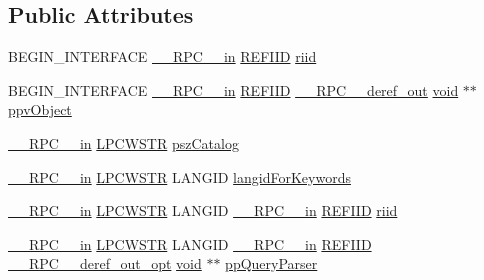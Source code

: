 \subsection*{Public Attributes}
\begin{DoxyCompactItemize}
\item 
B\+E\+G\+I\+N\+\_\+\+I\+N\+T\+E\+R\+F\+A\+CE \hyperlink{rpcsal_8h_a20b7f6da600a05c8b541659f14f7f0e6}{\+\_\+\+\_\+\+R\+P\+C\+\_\+\+\_\+in} \hyperlink{px__win__ds_8c_a80ec49c8ae61e234197d5071d2df497d}{R\+E\+F\+I\+ID} \hyperlink{struct_i_query_parser_manager_vtbl_a6a9583156244a6c5ef4afdb4addb9041}{riid}
\item 
B\+E\+G\+I\+N\+\_\+\+I\+N\+T\+E\+R\+F\+A\+CE \hyperlink{rpcsal_8h_a20b7f6da600a05c8b541659f14f7f0e6}{\+\_\+\+\_\+\+R\+P\+C\+\_\+\+\_\+in} \hyperlink{px__win__ds_8c_a80ec49c8ae61e234197d5071d2df497d}{R\+E\+F\+I\+ID} \hyperlink{rpcsal_8h_a23bc188526f10656f9c79d950f6c3192}{\+\_\+\+\_\+\+R\+P\+C\+\_\+\+\_\+deref\+\_\+out} \hyperlink{sound_8c_ae35f5844602719cf66324f4de2a658b3}{void} $\ast$$\ast$ \hyperlink{struct_i_query_parser_manager_vtbl_a0bc963e49a85e0ed532badc6649022f5}{ppv\+Object}
\item 
\hyperlink{rpcsal_8h_a20b7f6da600a05c8b541659f14f7f0e6}{\+\_\+\+\_\+\+R\+P\+C\+\_\+\+\_\+in} \hyperlink{mapinls_8h_a25fda90f83ded0efd5456a4e7eda1e0c}{L\+P\+C\+W\+S\+TR} \hyperlink{struct_i_query_parser_manager_vtbl_aca550c2fcdcaec315b5907cf0942fe94}{psz\+Catalog}
\item 
\hyperlink{rpcsal_8h_a20b7f6da600a05c8b541659f14f7f0e6}{\+\_\+\+\_\+\+R\+P\+C\+\_\+\+\_\+in} \hyperlink{mapinls_8h_a25fda90f83ded0efd5456a4e7eda1e0c}{L\+P\+C\+W\+S\+TR} L\+A\+N\+G\+ID \hyperlink{struct_i_query_parser_manager_vtbl_af0a82570e6701f5ff971f47515bd3ece}{langid\+For\+Keywords}
\item 
\hyperlink{rpcsal_8h_a20b7f6da600a05c8b541659f14f7f0e6}{\+\_\+\+\_\+\+R\+P\+C\+\_\+\+\_\+in} \hyperlink{mapinls_8h_a25fda90f83ded0efd5456a4e7eda1e0c}{L\+P\+C\+W\+S\+TR} L\+A\+N\+G\+ID \hyperlink{rpcsal_8h_a20b7f6da600a05c8b541659f14f7f0e6}{\+\_\+\+\_\+\+R\+P\+C\+\_\+\+\_\+in} \hyperlink{px__win__ds_8c_a80ec49c8ae61e234197d5071d2df497d}{R\+E\+F\+I\+ID} \hyperlink{struct_i_query_parser_manager_vtbl_a8fe409ae27aa94e54baada5c5f6c4130}{riid}
\item 
\hyperlink{rpcsal_8h_a20b7f6da600a05c8b541659f14f7f0e6}{\+\_\+\+\_\+\+R\+P\+C\+\_\+\+\_\+in} \hyperlink{mapinls_8h_a25fda90f83ded0efd5456a4e7eda1e0c}{L\+P\+C\+W\+S\+TR} L\+A\+N\+G\+ID \hyperlink{rpcsal_8h_a20b7f6da600a05c8b541659f14f7f0e6}{\+\_\+\+\_\+\+R\+P\+C\+\_\+\+\_\+in} \hyperlink{px__win__ds_8c_a80ec49c8ae61e234197d5071d2df497d}{R\+E\+F\+I\+ID} \hyperlink{rpcsal_8h_ab29e89ceb0eb0b075c6f6299b0de6a21}{\+\_\+\+\_\+\+R\+P\+C\+\_\+\+\_\+deref\+\_\+out\+\_\+opt} \hyperlink{sound_8c_ae35f5844602719cf66324f4de2a658b3}{void} $\ast$$\ast$ \hyperlink{struct_i_query_parser_manager_vtbl_a097ee7bd0a045ae057c52de25e7fa918}{pp\+Query\+Parser}

\end{DoxyCompactItemize}
